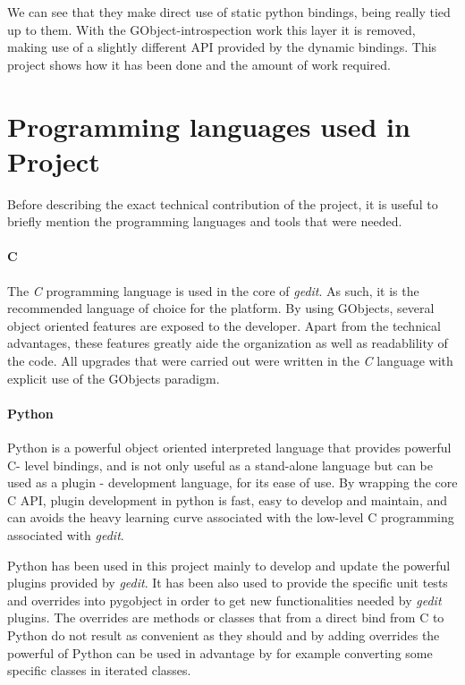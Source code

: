 
We can see that they make direct use of static python bindings, being really tied up 
to them. With the GObject-introspection work this layer it is removed, making use of a 
slightly different API provided by the dynamic bindings. This project shows how it has 
been done and the amount of work required.


\section{Programming languages used in Project}
\label{sec:ProgrammingLanguages}

Before describing the exact technical contribution of the project, it is useful to briefly mention 
the programming languages and tools that were needed.  

\paragraph{C}

The \emph{C} programming language is used in the core of \emph{gedit}.   As such, it is 
the recommended language of choice for the platform.  By using GObjects, several 
object oriented features are exposed to the developer.  Apart from the technical advantages, 
these features greatly aide the organization as well as readablility of the code.
All upgrades that were carried out were written in the \emph{C} language with explicit
use of the GObjects paradigm. 

\paragraph{Python}

Python is a powerful object oriented interpreted language that provides powerful 
C- level bindings, and is not only useful as a stand-alone language but can be used 
as a plugin - development language, for its ease of use.   By wrapping the core 
C API, plugin development in python is fast, easy to develop and maintain, and 
can avoids the heavy learning curve associated with the low-level C programming 
associated with \emph{gedit}.

Python has been used in this project mainly to develop and update the powerful 
plugins provided by \emph{gedit}. It has been also used to provide the specific 
unit tests and overrides into pygobject in order to get new functionalities needed by 
\emph{gedit} plugins. The overrides are methods or classes that from a direct 
bind from C to Python do not result as convenient as they should and by adding 
overrides the powerful of Python can be used in advantage by for example converting
some specific classes in iterated classes.


